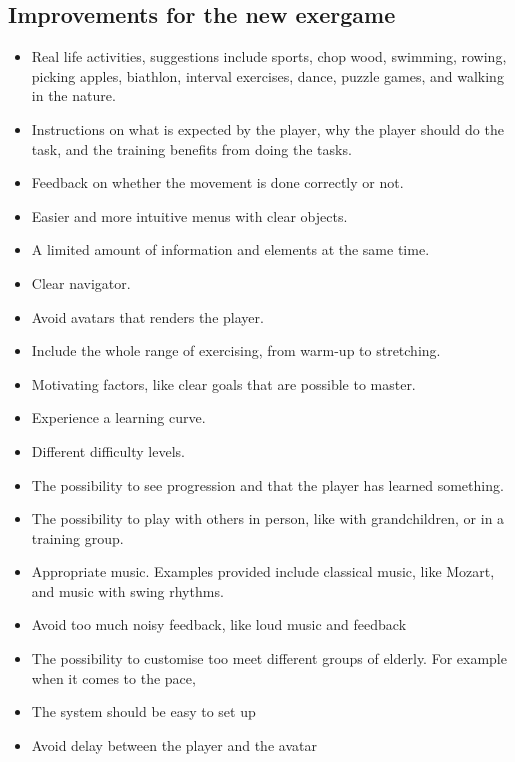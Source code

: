 \subsection{Improvements for the new exergame}
\begin{itemize}
\item Real life activities, suggestions include sports, chop wood, swimming, rowing, picking apples, biathlon, interval exercises, dance, puzzle games, and walking in the nature.
\item Instructions on what is expected by the player, why the player should do the task, and the training benefits from doing the tasks.
\item Feedback on whether the movement is done correctly or not.
\item Easier and more intuitive menus with clear objects.
\item A limited amount of information and elements at the same time.
\item Clear navigator.
\item Avoid avatars that renders the player.
\item Include the whole range of exercising, from warm-up to stretching.
\item Motivating factors, like clear goals that are possible to master.
\item Experience a learning curve.
\item Different difficulty levels.
\item The possibility to see progression and that the player has learned something.
\item The possibility to play with others in person, like with grandchildren, or in a training group.
\item Appropriate music. Examples provided include classical music, like Mozart, and music with swing rhythms.
\item Avoid too much noisy feedback, like loud music and feedback
\item The possibility to customise too meet different groups of elderly. For example when it comes to the pace,
\item The system should be easy to set up
\item Avoid delay between the player and the avatar
\end{itemize}






